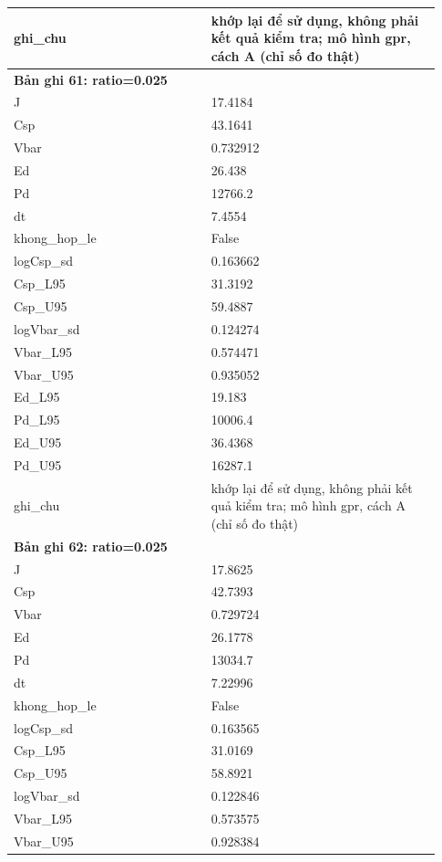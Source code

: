 \begin{longtable}{p{0.43\linewidth}p{0.50\linewidth}}
ghi\_\allowbreak chu & khớp lại để sử dụng, không phải kết quả kiểm tra; mô hình gpr, cách A (chỉ số đo thật) \\
\midrule
\multicolumn{2}{p{0.95\linewidth}}{\textbf{Bản ghi 61: ratio=0.025}} \\
J & 17.4184 \\
Csp & 43.1641 \\
Vbar & 0.732912 \\
Ed & 26.438 \\
Pd & 12766.2 \\
dt & 7.4554 \\
khong\_\allowbreak hop\_\allowbreak le & False \\
logCsp\_\allowbreak sd & 0.163662 \\
Csp\_\allowbreak L95 & 31.3192 \\
Csp\_\allowbreak U95 & 59.4887 \\
logVbar\_\allowbreak sd & 0.124274 \\
Vbar\_\allowbreak L95 & 0.574471 \\
Vbar\_\allowbreak U95 & 0.935052 \\
Ed\_\allowbreak L95 & 19.183 \\
Pd\_\allowbreak L95 & 10006.4 \\
Ed\_\allowbreak U95 & 36.4368 \\
Pd\_\allowbreak U95 & 16287.1 \\
ghi\_\allowbreak chu & khớp lại để sử dụng, không phải kết quả kiểm tra; mô hình gpr, cách A (chỉ số đo thật) \\
\midrule
\multicolumn{2}{p{0.95\linewidth}}{\textbf{Bản ghi 62: ratio=0.025}} \\
J & 17.8625 \\
Csp & 42.7393 \\
Vbar & 0.729724 \\
Ed & 26.1778 \\
Pd & 13034.7 \\
dt & 7.22996 \\
khong\_\allowbreak hop\_\allowbreak le & False \\
logCsp\_\allowbreak sd & 0.163565 \\
Csp\_\allowbreak L95 & 31.0169 \\
Csp\_\allowbreak U95 & 58.8921 \\
logVbar\_\allowbreak sd & 0.122846 \\
Vbar\_\allowbreak L95 & 0.573575 \\
Vbar\_\allowbreak U95 & 0.928384 \\

\end{longtable}
